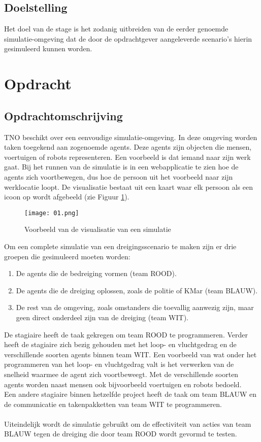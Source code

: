\documentclass[12pt, letterpaper]{article}
\begin{document}
\subsection{Doelstelling}
Het doel van de stage is het zodanig uitbreiden van de eerder genoemde simulatie-omgeving dat de door de opdrachtgever aangeleverde scenario's hierin gesimuleerd kunnen worden.




\newpage
\section{Opdracht} \label{opdracht}
\subsection{Opdrachtomschrijving}

TNO beschikt over een eenvoudige simulatie-omgeving. In deze omgeving worden taken toegekend aan zogenoemde agents. Deze agents zijn objecten die mensen, voertuigen of robots representeren. Een voorbeeld is dat iemand naar zijn werk gaat. Bij het runnen van de simulatie is in een webapplicatie te zien hoe de agents zich voortbewegen, dus hoe de persoon uit het voorbeeld naar zijn werklocatie loopt. De visualisatie bestaat uit een kaart waar elk persoon als een icoon op wordt afgebeeld (zie Figuur \ref{voorbeeld visualisatie}).

\begin{figure}[h]
\centering
\texttt{[image: 01.png]}
\caption{Voorbeeld van de visualisatie van een simulatie}
\label{voorbeeld visualisatie}
\end{figure}

\noindent Om een complete simulatie van een dreigingsscenario te maken zijn er drie groepen die gesimuleerd moeten worden:
\begin{enumerate}
    \item De agents die de bedreiging vormen (team ROOD).
    \item De agents die de dreiging oplossen, zoals de politie of KMar (team BLAUW).
    \item De rest van de omgeving, zoals omstanders die toevallig aanwezig zijn, maar geen direct onderdeel zijn van de dreiging (team WIT).
\end{enumerate}
De stagiaire heeft de taak gekregen om team ROOD te programmeren. Verder heeft de stagiaire zich bezig gehouden met het loop- en vluchtgedrag en de verschillende soorten agents binnen team WIT. Een voorbeeld van wat onder het programmeren van het loop- en vluchtgedrag valt is het verwerken van de snelheid waarmee de agent zich voortbeweegt. Met de verschillende soorten agents worden naast mensen ook bijvoorbeeld voertuigen en robots bedoeld. 
\\
Een andere stagiaire binnen hetzelfde project heeft de taak om team BLAUW en de communicatie en takenpakketten van team WIT te programmeren. \\ \\
Uiteindelijk wordt de simulatie gebruikt om de effectiviteit van acties van team BLAUW tegen de dreiging die door team ROOD wordt gevormd te testen.
\end{document}
